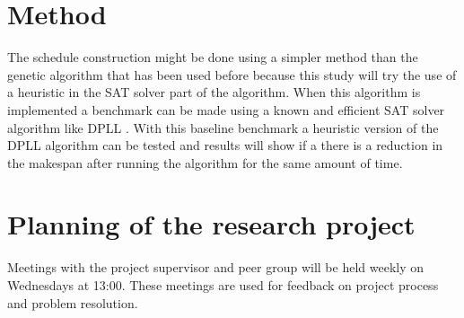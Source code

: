\documentclass[english]{article}
\begin{document}
\section*{Method}
The schedule construction might be done using a simpler method than the genetic algorithm that has been used before \cite{RN14} because this study will try the use of a heuristic in the SAT solver part of the algorithm. When this algorithm is implemented a benchmark can be made using a known and efficient SAT solver algorithm like DPLL \cite{RN16}. With this baseline benchmark a heuristic version of the DPLL algorithm can be tested and results will show if a there is a reduction in the makespan after running the algorithm for the same amount of time.\\

\section*{Planning of the research project}
Meetings with the project supervisor and peer group will be held weekly on Wednesdays at 13:00. These meetings are used for feedback on project process and problem resolution.
\end{document}
